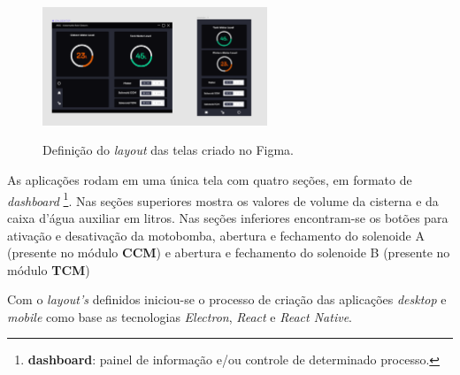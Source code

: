 \begin{figure}[H]
	\centering
	\caption{Definição do \textit{layout} das telas criado no Figma.}
	\includegraphics[width=0.6\textwidth]{figuras/figma_plan.png}
	\label{fig:figma_plan_desktop}
\end{figure}



As aplicações rodam em uma única tela com quatro seções, em formato de \textit{dashboard} \footnote{\textbf{dashboard}: painel de informação e/ou controle de determinado processo.}. Nas seções superiores mostra os valores de volume da cisterna e da caixa d'água auxiliar em litros. Nas seções inferiores encontram-se os botões para ativação e desativação da motobomba, abertura e fechamento do solenoide A (presente no módulo \textbf{CCM}) e abertura e fechamento do solenoide B (presente no módulo \textbf{TCM})

Com o \textit{layout's} definidos iniciou-se o processo de criação das aplicações \textit{desktop} e \textit{mobile} como base as tecnologias \textit{Electron}, \textit{React} e \textit{React Native}.